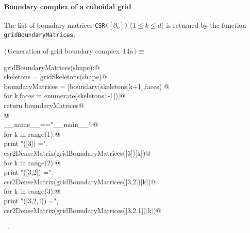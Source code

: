 \documentclass[11pt,oneside]{article}	%
\begin{document}
\paragraph{Boundary complex of a cuboidal grid}
The list of boundary matrices \texttt{CSR($[\partial_k]$)} ($1\leq k\leq d$) is returned by the function
\texttt{gridBoundaryMatrices}.

\begin{flushleft} \small \label{scrap19}
\protect{}$\langle\,$Generation of grid boundary complex\nobreak\ {\footnotesize 14a}$\,\rangle\equiv$
\vspace{-1ex}
\begin{list}{}{} \item
\mbox{}\verb@def gridBoundaryMatrices(shape):@\\
\mbox{}\verb@   skeletons = gridSkeletons(shape)@\\
\mbox{}\verb@   boundaryMatrices = [boundary(skeletons[k+1],faces) @\\
\mbox{}\verb@                   for k,faces in enumerate(skeletons[:-1])]@\\
\mbox{}\verb@   return boundaryMatrices@\\
\mbox{}\verb@   @\\
\mbox{}\verb@if __name__=="__main__":@\\
\mbox{}\verb@   for k in range(1):@\\
\mbox{}\verb@      print "\ngridBoundaryMatrices([3]) =\n", \@\\
\mbox{}\verb@            csr2DenseMatrix(gridBoundaryMatrices([3])[k])@\\
\mbox{}\verb@   for k in range(2):@\\
\mbox{}\verb@      print "\ngridBoundaryMatrices([3,2]) =\n", \@\\
\mbox{}\verb@            csr2DenseMatrix(gridBoundaryMatrices([3,2])[k])@\\
\mbox{}\verb@   for k in range(3):@\\
\mbox{}\verb@      print "\ngridBoundaryMatrices([3,2,1]) =\n", \@\\
\mbox{}\verb@            csr2DenseMatrix(gridBoundaryMatrices([3,2,1])[k])@\\
\mbox{}\verb@@{\NWsep}
\end{list}
\vspace{-1ex}
\footnotesize\addtolength{\baselineskip}{-1ex}
\begin{list}{}{\setlength{\itemsep}{-\parsep}\setlength{\itemindent}{-\leftmargin}}
\item \NWtxtMacroRefIn\ .
\end{list}
\end{flushleft}
\end{document}
